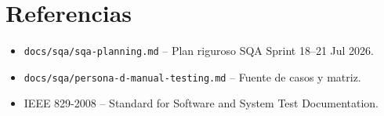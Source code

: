 \documentclass[12pt, a4paper]{article}
\begin{document}
\vspace{0.5cm}

\section*{Referencias}

\begin{itemize}
  \item \texttt{docs/sqa/sqa-planning.md} -- Plan riguroso SQA Sprint 18--21 Jul 2026.
  \item \texttt{docs/sqa/persona-d-manual-testing.md} -- Fuente de casos y matriz.
  \item IEEE 829-2008 -- Standard for Software and System Test Documentation.
\end{itemize}
\end{document}
